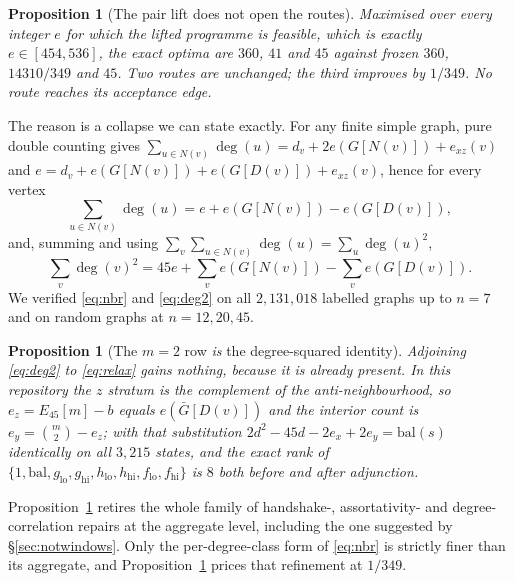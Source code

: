 \documentclass[11pt]{article}
\newtheorem{proposition}[theorem]{Proposition}
\theoremstyle{definition}
\begin{document}
\begin{proposition}[The pair lift does not open the routes]\label{prop:lift}
Maximised over every integer $e$ for which the lifted programme is feasible,
which is exactly $e\in[454,536]$, the exact optima are $360$, $41$ and $45$
against frozen $360$, $14310/349$ and $45$. Two routes are unchanged; the third
improves by $1/349$. No route reaches its acceptance edge.
\end{proposition}

The reason is a collapse we can state exactly. For any finite simple graph, pure
double counting gives $\sum_{u\in N(v)}\deg(u)=d_v+2e(G[N(v)])+e_{xz}(v)$ and
$e=d_v+e(G[N(v)])+e(G[D(v)])+e_{xz}(v)$, hence for every vertex
\begin{equation}\label{eq:nbr}
\sum_{u\in N(v)}\deg(u)=e+e(G[N(v)])-e(G[D(v)]),
\end{equation}
and, summing and using $\sum_v\sum_{u\in N(v)}\deg(u)=\sum_u\deg(u)^2$,
\begin{equation}\label{eq:deg2}
\sum_v\deg(v)^2=45e+\sum_v e(G[N(v)])-\sum_v e(G[D(v)]).
\end{equation}
We verified \eqref{eq:nbr} and \eqref{eq:deg2} on all $2{,}131{,}018$ labelled
graphs up to $n=7$ and on random graphs at $n=12,20,45$.

\begin{proposition}[The $m=2$ row \emph{is} the degree-squared identity]\label{prop:collapse}
Adjoining \eqref{eq:deg2} to \eqref{eq:relax} gains nothing, because it is
already present. In this repository the $z$ stratum is the complement of the
anti-neighbourhood, so $e_z=E_{45}[m]-b$ equals $e(\bar G[D(v)])$ and the
interior count is $e_y=\binom{m}{2}-e_z$; with that substitution
$2d^2-45d-2e_x+2e_y=\mathrm{bal}(s)$ identically on all $3{,}215$ states, and
the exact rank of $\{1,\mathrm{bal},g_{\mathrm{lo}},g_{\mathrm{hi}},
h_{\mathrm{lo}},h_{\mathrm{hi}},f_{\mathrm{lo}},f_{\mathrm{hi}}\}$ is $8$ both
before and after adjunction.
\end{proposition}

Proposition~\ref{prop:collapse} retires the whole family of handshake-,
assortativity- and degree-correlation repairs at the aggregate level, including
the one suggested by \S\ref{sec:notwindows}. Only the per-degree-class form of
\eqref{eq:nbr} is strictly finer than its aggregate, and
Proposition~\ref{prop:lift} prices that refinement at $1/349$.
\end{document}
